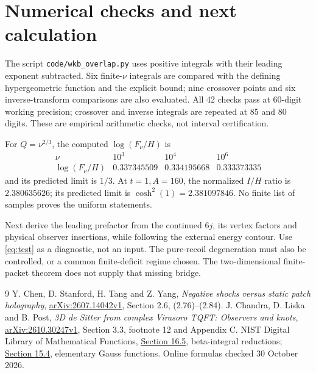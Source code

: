 \documentclass[11pt,a4paper]{article}
\begin{document}
\section{Numerical checks and next calculation}
The script \texttt{code/wkb\_overlap.py} uses positive integrals with
their leading exponent subtracted. Six finite-\(\nu\) integrals are
compared with the defining hypergeometric function and the explicit
bound; nine crossover points and six inverse-transform comparisons
are also evaluated. All 42 checks pass at 60-digit working precision;
crossover and inverse integrals are repeated at 85 and 80 digits.
These are empirical arithmetic checks, not interval certification.

For \(Q=\nu^{2/3}\), the computed \(\log(F_\nu/H)\) is
\[
\begin{array}{c|ccc}
\nu&10^3&10^4&10^6\\ \hline
\log(F_\nu/H)&0.337345509&0.334195668&0.333373335
\end{array}
\]
and its predicted limit is \(1/3\).
At \(t=1,A=160\), the normalized \(I/H\) ratio is \(2.380635626\);
its predicted limit is \(\cosh^2(1)=2.381097846\).
No finite list of samples proves the uniform statements.

Next derive the leading prefactor from the continued \(6j\), its vertex
factors and physical observer insertions, while following the external
energy contour. Use \eqref{eq:test} as a diagnostic, not an input.
The pure-recoil degeneration must also be controlled, or a common
finite-deficit regime chosen. The two-dimensional finite-packet theorem
does not supply that missing bridge.

\begin{thebibliography}{9}
 Y. Chen, D. Stanford, H. Tang and Z. Yang,
\emph{Negative shocks versus static patch holography},
\href{https://arxiv.org/html/2607.14042v1}{arXiv:2607.14042v1},
Section 2.6, (2.76)--(2.84).
 J. Chandra, D. Liska and B. Post,
\emph{3D de Sitter from complex Virasoro TQFT: Observers and knots},
\href{https://arxiv.org/html/2610.30247v1}{arXiv:2610.30247v1},
Section 3.3, footnote 12 and Appendix C.
 NIST Digital Library of Mathematical Functions,
\href{https://dlmf.nist.gov/16.5}{Section 16.5},
beta-integral reductions; \href{https://dlmf.nist.gov/15.4}{Section 15.4},
elementary Gauss functions. Online formulas checked 30 October 2026.
\end{thebibliography}
\end{document}
